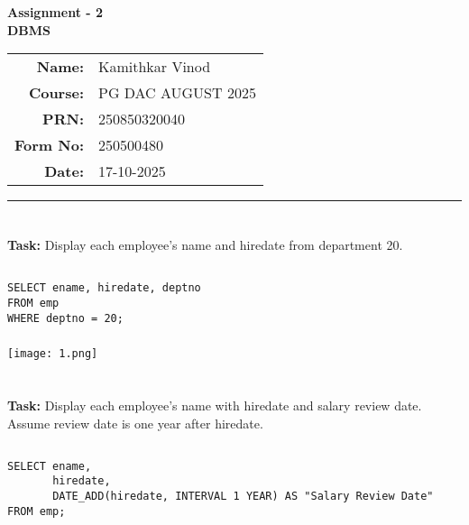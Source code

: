 \documentclass[12pt,a4paper]{article}
\begin{document}
\begin{center}
    \LARGE \textbf{Assignment - 2} \\[0.5cm]
    \Large \textbf{DBMS} \\[1cm]

    \begin{tabular}{rl}
        \textbf{Name:} & Kamithkar Vinod \\
        \textbf{Course:} & PG DAC AUGUST 2025 \\
        \textbf{PRN:} & 250850320040 \\
        \textbf{Form No:} & 250500480 \\
        \textbf{Date:} & 17-10-2025 \\
    \end{tabular}
\end{center}

\vspace{1cm}
\hrule
\vspace{0.5cm}


\section{}
\textbf{Task:} Display each employee's name and hiredate from department 20.

\subsection{}
\begin{lstlisting}
SELECT ename, hiredate, deptno
FROM emp
WHERE deptno = 20;
\end{lstlisting}

\subsubsection{}
\begin{center}
    \texttt{[image: 1.png]}
\end{center}


\section{}
\textbf{Task:} Display each employee's name with hiredate and salary review date.
Assume review date is one year after hiredate.

\subsection{}
\begin{lstlisting}
SELECT ename,
       hiredate,
       DATE_ADD(hiredate, INTERVAL 1 YEAR) AS "Salary Review Date"
FROM emp;
\end{lstlisting}
\end{document}
